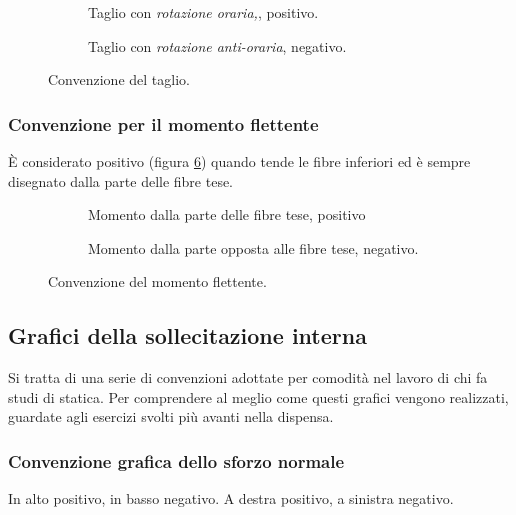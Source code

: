 \documentclass[main.tex]{subfiles}
\begin{document}
\begin{figure}[H]
  \begin{subfigure}[b]{.5\textwidth}
    \centering
    \resizebox{0.5\textwidth}{!}{}
    \caption{Taglio con \textit{rotazione oraria,}, positivo.}
    \label{taglio_positivo}
  \end{subfigure}
  \hfill
  \begin{subfigure}[b]{.5\textwidth}
  \centering
    \resizebox{0.5\textwidth}{!}{}
    \caption{Taglio con \textit{rotazione anti-oraria}, negativo.}
    \label{taglio_negativo}
  \end{subfigure}
  \caption{Convenzione del taglio.}
\end{figure}

\subsubsection{Convenzione per il momento flettente}
È considerato positivo (figura \ref{convenzione_momento}) quando tende le fibre inferiori ed è sempre disegnato dalla parte delle fibre tese.

\begin{figure}[H]
  \begin{subfigure}[b]{.5\textwidth}
    \centering
    \resizebox{0.5\textwidth}{!}{}
    \caption{Momento dalla parte delle fibre tese, positivo}
    \label{momento_positivo}
  \end{subfigure}
  \hfill
  \begin{subfigure}[b]{.5\textwidth}
  \centering
    \resizebox{0.5\textwidth}{!}{}
    \caption{Momento dalla parte opposta alle fibre tese, negativo.}
    \label{momento_negativo}
  \end{subfigure}
  \caption{Convenzione del momento flettente.}
  \label{convenzione_momento}
\end{figure}

\subsection{Grafici della sollecitazione interna}
Si tratta di una serie di convenzioni adottate per comodità nel lavoro di chi fa studi di statica. Per comprendere al meglio come questi grafici vengono realizzati, guardate agli esercizi svolti più avanti nella dispensa.

\subsubsection{Convenzione grafica dello sforzo normale}
In alto positivo, in basso negativo. A destra positivo, a sinistra negativo.
\end{document}
